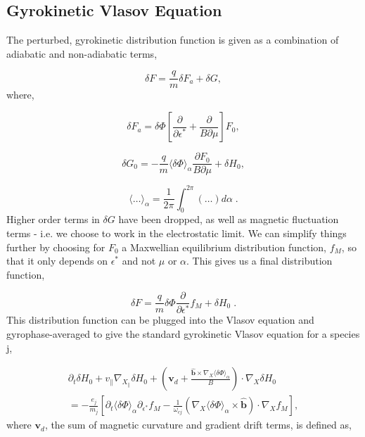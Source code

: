\documentclass[12pt]{article}
\numberwithin{equation}{subsection}
\begin{document}
\subsection{Gyrokinetic Vlasov Equation}
   \quad The perturbed, gyrokinetic distribution function is given as a combination of adiabatic
and non-adiabatic terms\cite{FriemanChen},

   \begin{equation}
      \delta F = \frac{q}{m}\delta F_a + \delta G,
   \end{equation}
where,
    
   \begin{equation}
      \delta F_a = \delta\Phi[\frac{\partial}{\partial\epsilon^*} + \frac{\partial}{B\partial\mu}]F_0, 
   \end{equation}
   
   \begin{equation}
      \delta G_0 = -\frac{q}{m}\langle\delta\Phi\rangle_\alpha\frac{\partial F_0}{B\partial\mu} + \delta H_0,
   \end{equation}

   \begin{equation}
      \langle\ldots\rangle_\alpha = \frac{1}{2\pi}\int_{0}^{2\pi}(\ldots)d\alpha\;.
   \end{equation}
Higher order terms in $\delta G$ have been dropped, as well as magnetic fluctuation terms - i.e. we choose to
work in the electrostatic limit. We can simplify things further by choosing for $F_0$ a Maxwellian equilibrium
distribution function, $f_M$, so that it only depends on $\epsilon^*$ and not $\mu$ or $\alpha$. This gives us
a final distribution function,

   \begin{equation}
      \delta F = \frac{q}{m}\delta\Phi\frac{\partial}{\partial\epsilon^*}f_M + \delta H_0\;.
   \end{equation}
This distribution function can be plugged into the Vlasov equation and gyrophase-averaged to give the standard gyrokinetic Vlasov
equation for a species j\cite{FriemanChen},

   \begin{equation}
   \begin{aligned}
        \partial_t\delta H_0 + v_\parallel\nabla_{X_\parallel}\delta H_0 +
        (\bm{v}_d + \frac{\bm{\hat{b}}\times\nabla_X\langle\delta\Phi\rangle_\alpha}{B})\cdot\nabla_X\delta H_0 \\
      = -\frac{e_j}{m_j}[\partial_t\langle\delta\Phi\rangle_\alpha\partial_{\epsilon^*} f_M
        -\frac{1}{\omega_{cj}}(\nabla_X\langle\delta\Phi\rangle_\alpha\times\bm{\hat{b}})\cdot\nabla_X f_M],
   \end{aligned}
   \end{equation}
where $\bm{v}_d$, the sum of magnetic curvature and gradient drift terms, is defined as,
\end{document}
